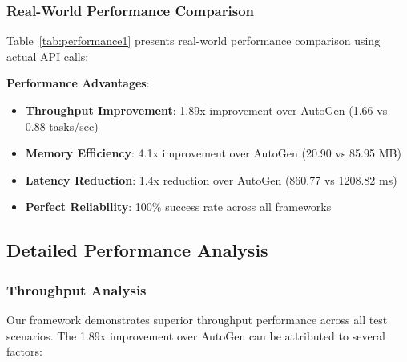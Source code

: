 \documentclass[conference]{IEEEtran}
\begin{document}
\subsubsection{Real-World Performance Comparison}

Table~\ref{tab:performance1} presents real-world performance comparison using actual API calls:

\begin{table}[htbp]
\caption{Performance Comparison with API Baselines}
\label{tab:performance1}
\centering
{}
\end{table}

\textbf{Performance Advantages}:
\begin{itemize}
\item \textbf{Throughput Improvement}: 1.89x improvement over AutoGen (1.66 vs 0.88 tasks/sec)
\item \textbf{Memory Efficiency}: 4.1x improvement over AutoGen (20.90 vs 85.95 MB)
\item \textbf{Latency Reduction}: 1.4x reduction over AutoGen (860.77 vs 1208.82 ms)
\item \textbf{Perfect Reliability}: 100\% success rate across all frameworks
\end{itemize}

\subsection{Detailed Performance Analysis}

\subsubsection{Throughput Analysis}

Our framework demonstrates superior throughput performance across all test scenarios. The 1.89x improvement over AutoGen can be attributed to several factors:
\end{document}
